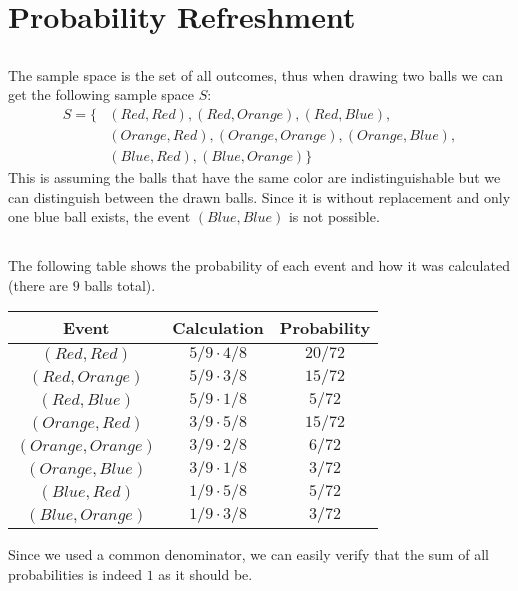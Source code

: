 \documentclass[a4paper]{article}
\begin{document}
\section{Probability Refreshment}
\subsection{}
The sample space is the set of all outcomes, thus when drawing two balls we can get the
following sample space $S$:
\begin{align*}
  S=\{&(Red, Red),(Red, Orange),(Red, Blue), \\
   &(Orange, Red), (Orange, Orange), (Orange, Blue), \\
   &(Blue, Red), (Blue, Orange)\}
\end{align*}
This is assuming the balls that have the same color are indistinguishable but we can distinguish between the drawn balls. Since it is without replacement and only one blue ball exists, the event $(Blue, Blue)$ is not possible.

\subsection{}
The following table shows the probability of each event and how it was calculated (there are $9$ balls total).
\begin{center}
  \begin{tabular}{c|c|c}
    Event & Calculation & Probability \\
    \hline
    $(Red, Red)$ & $5/9\cdot 4/8$ & $20/72$ \\
    \hline
    $(Red, Orange)$ & $5/9\cdot 3/8$ & $15/72$ \\
    \hline
    $(Red, Blue)$ & $5/9\cdot 1/8$ & $5/72$ \\
    \hline
    $(Orange, Red)$ & $3/9\cdot 5/8$ & $15/72$ \\
    \hline
    $(Orange, Orange)$ & $3/9\cdot 2/8$ & $6/72$ \\
    \hline
    $(Orange, Blue)$ & $3/9\cdot 1/8$ & $3/72$ \\
    \hline
    $(Blue, Red)$ & $1/9\cdot 5/8$ & $5/72$ \\
    \hline
    $(Blue, Orange)$ & $1/9\cdot 3/8$ & $3/72$ \\
  \end{tabular}
\end{center}
Since we used a common denominator, we can easily verify that the sum of all probabilities is indeed $1$ as it should be.
\end{document}
